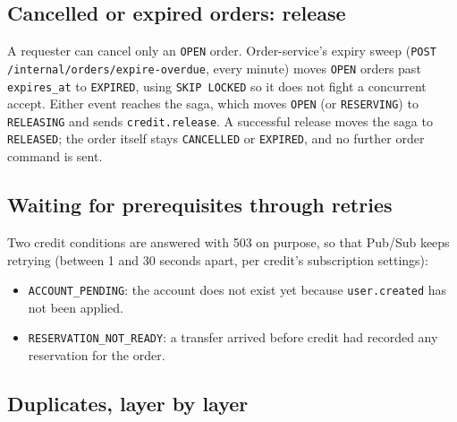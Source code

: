 \documentclass[11pt,a4paper]{article}
\newcommand{\code}[1]{\nolinkurl{#1}}
\begin{document}
\subsection{Cancelled or expired orders: release}

A requester can cancel only an \code{OPEN} order. Order-service's expiry sweep
(\code{POST /internal/orders/expire-overdue}, every minute) moves \code{OPEN} orders past
\code{expires_at} to \code{EXPIRED}, using \code{SKIP LOCKED} so it does not fight a
concurrent accept. Either event reaches the saga, which moves \code{OPEN} (or
\code{RESERVING}) to \code{RELEASING} and sends \code{credit.release}. A successful
release moves the saga to \code{RELEASED}; the order itself stays \code{CANCELLED} or
\code{EXPIRED}, and no further order command is sent.

\subsection{Waiting for prerequisites through retries}

Two credit conditions are answered with 503 on purpose, so that Pub/Sub keeps retrying
(between 1 and 30 seconds apart, per credit's subscription settings):
\begin{itemize}
  \item \code{ACCOUNT_PENDING}: the account does not exist yet because
  \code{user.created} has not been applied.
  \item \code{RESERVATION_NOT_READY}: a transfer arrived before credit had recorded
  any reservation for the order.
\end{itemize}

\subsection{Duplicates, layer by layer}
\end{document}
